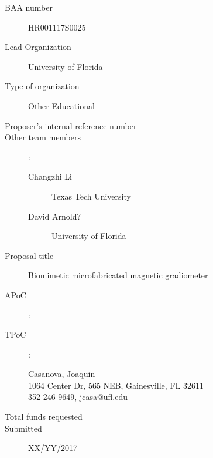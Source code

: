 
\begin{description}
\item [BAA number] HR001117S0025
\item [Lead Organization] University of Florida
\item [Type of organization] Other Educational
\item [Proposer’s internal reference number]
\item [Other team members]:
\begin{description}
\item [Changzhi Li] Texas Tech University
\item [David Arnold?] University of Florida 
\end{description}
\item [Proposal title] Biomimetic microfabricated magnetic gradiometer
\item [APoC]:
\begin{description}
\item []
\item []
\item []
\end{description}
\item [TPoC]:
\begin{description}
\item [Casanova, Joaquin]
\item [1064 Center Dr, 565 NEB, Gainesville, FL 32611]
\item [352-246-9649, jcasa@ufl.edu]
\end{description}
\item [Total funds requested]
\item [Submitted] XX/YY/2017
\end{description}
